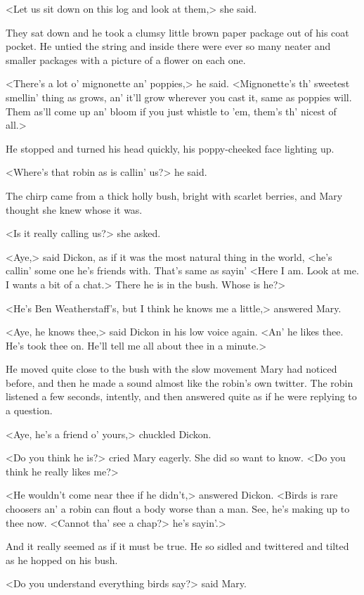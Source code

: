 <Let us sit down on this log and look at them,> she said.

They sat down and he took a clumsy little brown paper package out of his coat pocket. He untied the string and inside there were ever so many neater and smaller packages with a picture of a flower on each one.

<There's a lot o' mignonette an' poppies,> he said. <Mignonette's th' sweetest smellin' thing as grows, an' it'll grow wherever you cast it, same as poppies will. Them as'll come up an' bloom if you just whistle to 'em, them's th' nicest of all.>

He stopped and turned his head quickly, his poppy-cheeked face lighting up.

<Where's that robin as is callin' us?> he said.

The chirp came from a thick holly bush, bright with scarlet berries, and Mary thought she knew whose it was.

<Is it really calling us?> she asked.

<Aye,> said Dickon, as if it was the most natural thing in the world, <he's callin' some one he's friends with. That's same as sayin' <Here I am. Look at me. I wants a bit of a chat.> There he is in the bush. Whose is he?>

<He's Ben Weatherstaff's, but I think he knows me a little,> answered Mary.

<Aye, he knows thee,> said Dickon in his low voice again. <An' he likes thee. He's took thee on. He'll tell me all about thee in a minute.>

He moved quite close to the bush with the slow movement Mary had noticed before, and then he made a sound almost like the robin's own twitter. The robin listened a few seconds, intently, and then answered quite as if he were replying to a question.

<Aye, he's a friend o' yours,> chuckled Dickon.

<Do you think he is?> cried Mary eagerly. She did so want to know. <Do you think he really likes me?>

<He wouldn't come near thee if he didn't,> answered Dickon. <Birds is rare choosers an' a robin can flout a body worse than a man. See, he's making up to thee now. <Cannot tha' see a chap?> he's sayin'.>

And it really seemed as if it must be true. He so sidled and twittered and tilted as he hopped on his bush.

<Do you understand everything birds say?> said Mary.

